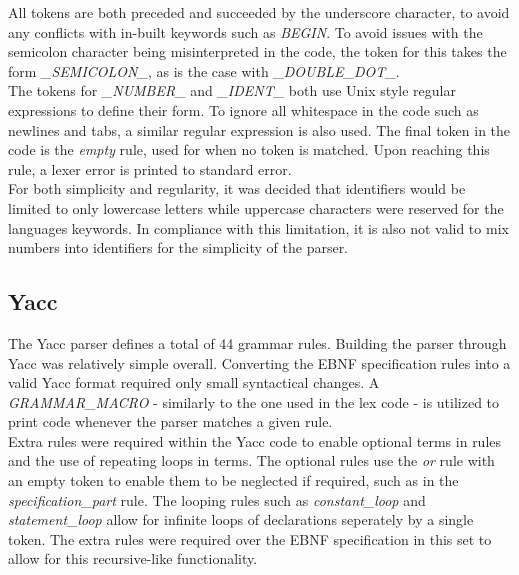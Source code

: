 \documentclass[]{article}
\begin{document}
All tokens are both preceded and succeeded by the underscore character, to avoid any conflicts with in-built keywords such as \textit{BEGIN}. To avoid issues with the semicolon character being misinterpreted in the code, the token for this takes the form \textit{_SEMICOLON_}, as is the case with \textit{_DOUBLE_DOT_}. \\

The tokens for \textit{_NUMBER_} and \textit{_IDENT_} both use Unix style regular expressions to define their form. To ignore all whitespace in the code such as newlines and tabs, a similar regular expression is also used. The final token in the code is the \textit{empty} rule, used for when no token is matched. Upon reaching this rule, a lexer error is printed to standard error.\\

For both simplicity and regularity, it was decided that identifiers would be limited to only lowercase letters while uppercase characters were reserved for the languages keywords. In compliance with this limitation, it is also not valid to mix numbers into identifiers for the simplicity of the parser.

\vspace{0.5cm}
\subsection*{Yacc}
\vspace{0.5cm}

The Yacc parser defines a total of 44 grammar rules. Building the parser through Yacc was relatively simple overall. Converting the EBNF specification rules into a valid Yacc format required only small syntactical changes. A \textit{GRAMMAR_MACRO} - similarly to the one used in the lex code - is utilized to print code whenever the parser matches a given rule.\\

Extra rules were required within the Yacc code to enable optional terms in rules and the use of repeating loops in terms. The optional rules use the \textit{or} rule with an empty token to enable them to be neglected if required, such as in the \textit{specification_part} rule. The looping rules such as \textit{constant_loop} and \textit{statement_loop} allow for infinite loops of declarations seperately by a single token. The extra rules were required over the EBNF specification in this set to allow for this recursive-like functionality.

\end{document}
